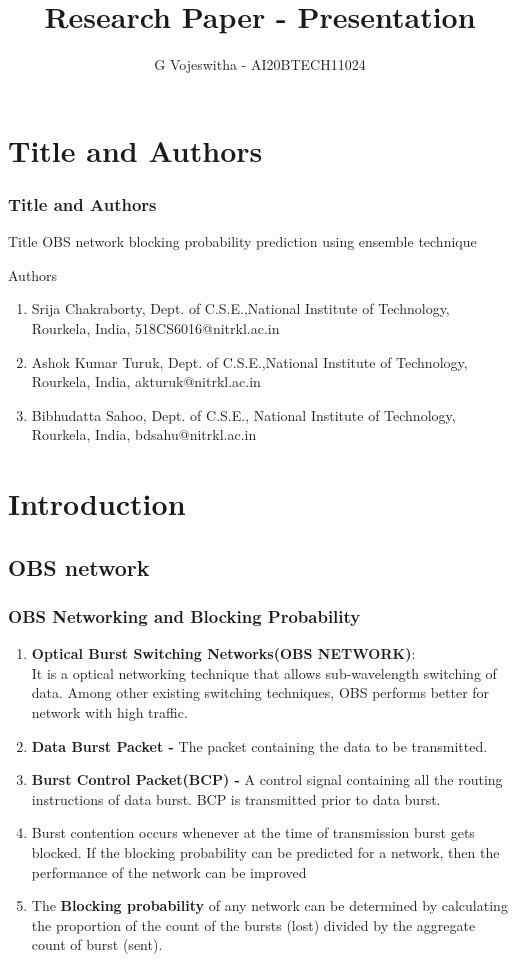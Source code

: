\documentclass{beamer}
\title{Research Paper - Presentation}
\author{G Vojeswitha  - AI20BTECH11024}
\begin{document}
\begin{frame}
\titlepage
\end{frame}
\section{Title and Authors}
\begin{frame}
\frametitle{Title and Authors}
\begin{block}{Title}
OBS network blocking probability prediction using ensemble technique 
\end{block}
\begin{block}{Authors}
\begin{enumerate}
    \item Srija Chakraborty, Dept. of C.S.E.,National Institute of Technology, Rourkela, India, 518CS6016@nitrkl.ac.in
    \item Ashok Kumar Turuk, Dept. of C.S.E.,National Institute of Technology, Rourkela, India, akturuk@nitrkl.ac.in
    \item Bibhudatta Sahoo, Dept. of C.S.E., National Institute of Technology, Rourkela, India, bdsahu@nitrkl.ac.in
\end{enumerate}
\end{block}
\end{frame}

\section{\textbf{Introduction}}
\subsection*{OBS network}
\begin{frame}[fragile]
\frametitle{OBS Networking and Blocking Probability}
 \begin{enumerate}
    \item \textbf{Optical Burst Switching Networks(OBS NETWORK)}: \\It is a optical networking technique that allows sub-wavelength switching of data. Among other existing switching techniques, OBS performs better for network with high traffic. 
    \item \textbf{Data Burst Packet - }The packet containing the data to be transmitted.
    \item \textbf{Burst Control Packet(BCP) -} A control signal containing all the routing instructions of data burst. BCP is transmitted prior to data burst.
    \item Burst contention occurs
whenever at the time of transmission burst gets blocked. If the blocking probability can be predicted for a network, then the performance of the network can be improved
    \item The \textbf{Blocking probability} of any network can be determined by calculating the proportion of the count of the bursts (lost) divided by the aggregate count of burst (sent).
\end{enumerate}
\end{frame}
\end{document}
